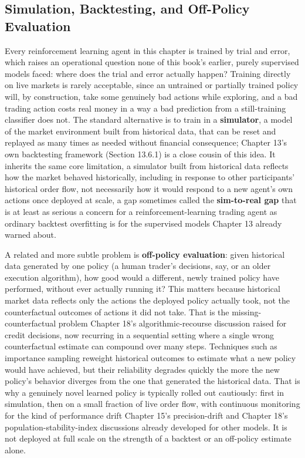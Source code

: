 \documentclass[../ai_in_finance]{subfiles}
\begin{document}
\subsection{Simulation, Backtesting, and Off-Policy Evaluation}
\label{sec:rl-evaluation}

Every reinforcement learning agent in this chapter is trained by trial and error, which raises an operational question none of this book's earlier, purely supervised models faced: where does the trial and error actually happen? Training directly on live markets is rarely acceptable, since an untrained or partially trained policy will, by construction, take some genuinely bad actions while exploring, and a bad trading action costs real money in a way a bad prediction from a still-training classifier does not. The standard alternative is to train in a \textbf{simulator}, a model of the market environment built from historical data, that can be reset and replayed as many times as needed without financial consequence; Chapter 13's own backtesting framework (Section 13.6.1) is a close cousin of this idea. It inherits the same core limitation, a simulator built from historical data reflects how the market behaved historically, including in response to other participants' historical order flow, not necessarily how it would respond to a new agent's own actions once deployed at scale, a gap sometimes called the \textbf{sim-to-real gap} that is at least as serious a concern for a reinforcement-learning trading agent as ordinary backtest overfitting is for the supervised models Chapter 13 already warned about.

A related and more subtle problem is \textbf{off-policy evaluation}: given historical data generated by one policy (a human trader's decisions, say, or an older execution algorithm), how good would a different, newly trained policy have performed, without ever actually running it? This matters because historical market data reflects only the actions the deployed policy actually took, not the counterfactual outcomes of actions it did not take. That is the missing-counterfactual problem Chapter 18's algorithmic-recourse discussion raised for credit decisions, now recurring in a sequential setting where a single wrong counterfactual estimate can compound over many steps. Techniques such as importance sampling reweight historical outcomes to estimate what a new policy would have achieved, but their reliability degrades quickly the more the new policy's behavior diverges from the one that generated the historical data. That is why a genuinely novel learned policy is typically rolled out cautiously: first in simulation, then on a small fraction of live order flow, with continuous monitoring for the kind of performance drift Chapter 15's precision-drift and Chapter 18's population-stability-index discussions already developed for other models. It is not deployed at full scale on the strength of a backtest or an off-policy estimate alone.
\end{document}
